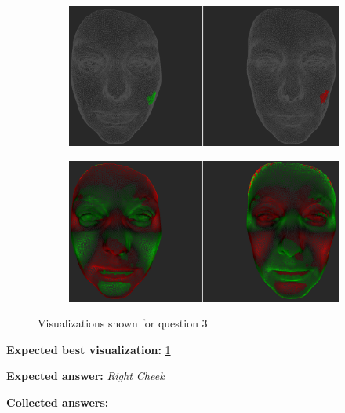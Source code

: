 \begin{figure}[h]
\begin{subfigure}{0.49\textwidth}
\includegraphics[width=\textwidth]{./img-study/pair5.PNG}
\caption{}
\label{fig:study-2-5}
\end{subfigure}
\begin{subfigure}{0.49\textwidth}
\includegraphics[width=\textwidth]{./img-study/pair7.PNG}
\caption{}
\label{fig:study-2-7}
\end{subfigure}
\caption{Visualizations shown for question 3}
\end{figure}
\medskip

{\bf Expected best visualization:} \ref{fig:study-2-5}
\medskip

{\bf Expected answer:} {\it Right Cheek}
\medskip

{\bf Collected answers:}

